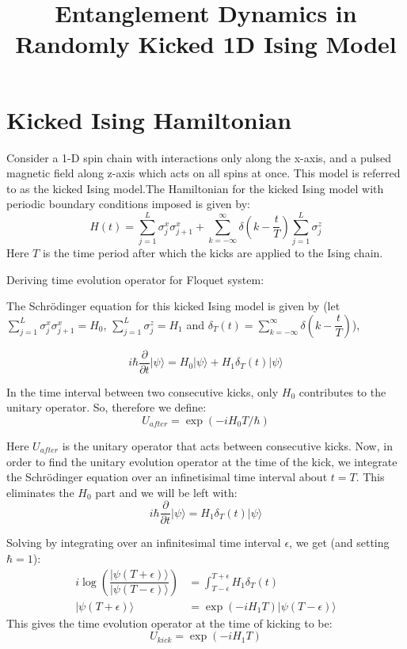 \documentclass[11pt,a4paper]{article}
\title{Entanglement Dynamics in Randomly Kicked 1D Ising Model}
\begin{document}
\maketitle
\tableofcontents
\section{Kicked  Ising Hamiltonian }
Consider a 1-D spin chain with interactions only along the x-axis, and a pulsed magnetic field along z-axis which acts on all spins at once. This model is referred to as the kicked Ising model.The Hamiltonian for the kicked Ising model with periodic boundary conditions imposed is given by:
		 \begin{equation}\label{key}
		 H(t)= \sum_{j=1}^{L}\sigma_{j}^{x} \sigma_{j+1}^{x} + \sum_{k=-\infty}^{\infty}\delta(k-\dfrac{t}{T})\sum_{j=1}^{L}\sigma_{j}^{z}
		 \end{equation}
		 Here $T$ is the time period after which the kicks are applied to the Ising chain. 
		
Deriving time evolution operator for Floquet system:

The Schr\"{o}dinger equation for this kicked Ising model is given by (let $\sum_{j=1}^{L}\sigma_{j}^{x} \sigma_{j+1}^{x}  = H_{0} $, $\sum_{j=1}^{L}\sigma_{j}^{z} = H_{1}$ and $\delta_{T}(t) =  \sum_{k=-\infty}^{\infty}\delta(k-\dfrac{t}{T})$),

\begin{equation}
i \hbar \dfrac{\partial}{\partial t}|\psi\rangle = H_{0}|\psi\rangle + H_{1} \delta_{T}(t) |\psi\rangle
\end{equation}

 In the time interval between two consecutive kicks, only $H_{0}$ contributes to the unitary operator. So, therefore we define:
\begin{equation}
U_{after} = \exp(-iH_{0}T/\hbar)
\end{equation}

Here $U_{after}$ is the unitary operator that acts between consecutive kicks. Now, in order to find the unitary evolution operator at the time of the kick, we integrate the Schr\"{o}dinger equation over an infinetisimal time interval about $t = T $. This eliminates the $H_{0}$ part and we will be left with:
\begin{equation}
i\hbar \dfrac{\partial}{\partial t} |\psi\rangle = H_{1}\delta_{T}(t) |\psi\rangle
\end{equation}

Solving by integrating over an infinitesimal time interval $\epsilon$, we get (and setting $\hbar = 1$):
\begin{align}
i \log(\dfrac{|\psi(T+\epsilon)\rangle}{|\psi(T-\epsilon)\rangle}) &= \int_{T-\epsilon}^{T+\epsilon} H_{1}\delta_{T}(t)\\
|\psi(T+\epsilon)\rangle &= \exp(-iH_{1}T)|\psi(T-\epsilon)\rangle 
\end{align}
This gives the time evolution operator at the time of kicking to be:
\begin{equation}
U_{kick} = \exp(-iH_{1}T)
\end{equation}
\end{document}
